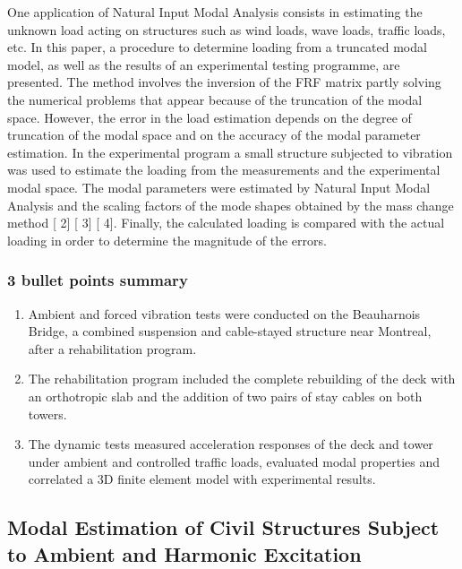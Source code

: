\documentclass[
  letterpaper,
  DIV=11,
  numbers=noendperiod]{scrreprt}
\providecommand{\tightlist}{%
  \setlength{\itemsep}{0pt}\setlength{\parskip}{0pt}}\usepackage{longtable,booktabs,array}
\begin{document}
One application of Natural Input Modal Analysis consists in estimating
the unknown load acting on structures such as wind loads, wave loads,
traffic loads, etc. In this paper, a procedure to determine loading from
a truncated modal model, as well as the results of an experimental
testing programme, are presented. The method involves the inversion of
the FRF matrix partly solving the numerical problems that appear because
of the truncation of the modal space. However, the error in the load
estimation depends on the degree of truncation of the modal space and on
the accuracy of the modal parameter estimation. In the experimental
program a small structure subjected to vibration was used to estimate
the loading from the measurements and the experimental modal space. The
modal parameters were estimated by Natural Input Modal Analysis and the
scaling factors of the mode shapes obtained by the mass change method
{[} 2{]} {[} 3{]} {[} 4{]}. Finally, the calculated loading is compared
with the actual loading in order to determine the magnitude of the
errors.

\hypertarget{bullet-points-summary-13}{%
\subsubsection{3 bullet points summary}\label{bullet-points-summary-13}}

\begin{enumerate}
\def\labelenumi{\arabic{enumi}.}
\tightlist
\item
  Ambient and forced vibration tests were conducted on the Beauharnois
  Bridge, a combined suspension and cable-stayed structure near
  Montreal, after a rehabilitation program.
\item
  The rehabilitation program included the complete rebuilding of the
  deck with an orthotropic slab and the addition of two pairs of stay
  cables on both towers.
\item
  The dynamic tests measured acceleration responses of the deck and
  tower under ambient and controlled traffic loads, evaluated modal
  properties and correlated a 3D finite element model with experimental
  results.
\end{enumerate}

\hypertarget{modal-estimation-of-civil-structures-subject-to-ambient-and-harmonic-excitation}{%
\subsection{Modal Estimation of Civil Structures Subject to Ambient and
Harmonic
Excitation}\label{modal-estimation-of-civil-structures-subject-to-ambient-and-harmonic-excitation}}
\end{document}
